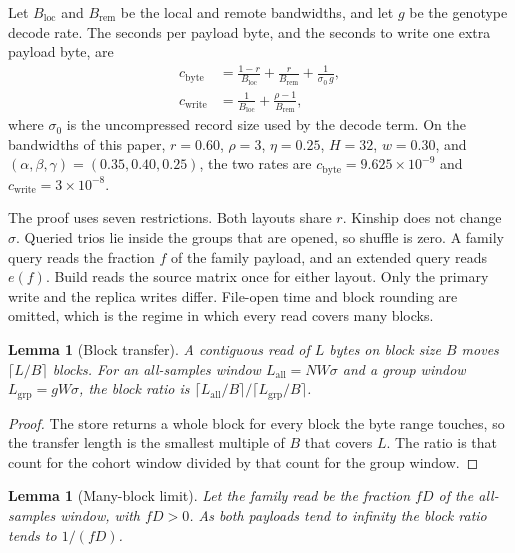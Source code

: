 \documentclass[11pt]{article}
\newtheorem{lemma}[theorem]{Lemma}
\begin{document}
Let \(B_{\mathrm{loc}}\) and \(B_{\mathrm{rem}}\) be the local and remote bandwidths, and let \(g\) be the genotype decode rate.
The seconds per payload byte, and the seconds to write one extra payload byte, are
\begin{align}
c_{\mathrm{byte}}
  &= \frac{1-r}{B_{\mathrm{loc}}} + \frac{r}{B_{\mathrm{rem}}} + \frac{1}{\sigma_0 \, g}, \\
c_{\mathrm{write}}
  &= \frac{1}{B_{\mathrm{loc}}} + \frac{\rho-1}{B_{\mathrm{rem}}},
\end{align}
where \(\sigma_0\) is the uncompressed record size used by the decode term.
On the bandwidths of this paper, \(r = 0.60\), \(\rho = 3\), \(\eta = 0.25\), \(H = 32\), \(w = 0.30\), and \((\alpha,\beta,\gamma) = (0.35, 0.40, 0.25)\),
the two rates are \(c_{\mathrm{byte}} = 9.625\times 10^{-9}\) and \(c_{\mathrm{write}} = 3\times 10^{-8}\).

The proof uses seven restrictions.
Both layouts share \(r\).
Kinship does not change \(\sigma\).
Queried trios lie inside the groups that are opened, so shuffle is zero.
A family query reads the fraction \(f\) of the family payload, and an extended query reads \(e(f)\).
Build reads the source matrix once for either layout.
Only the primary write and the replica writes differ.
File-open time and block rounding are omitted, which is the regime in which every read covers many blocks.

\begin{lemma}[Block transfer]
\label{lem:blocks}
A contiguous read of \(L\) bytes on block size \(B\) moves \(\lceil L/B \rceil\) blocks.
For an all-samples window \(L_{\mathrm{all}} = N W \sigma\) and a group window \(L_{\mathrm{grp}} = g W \sigma\), the block ratio is \(\lceil L_{\mathrm{all}}/B \rceil / \lceil L_{\mathrm{grp}}/B \rceil\).
\end{lemma}

\begin{proof}
The store returns a whole block for every block the byte range touches, so the transfer length is the smallest multiple of \(B\) that covers \(L\).
The ratio is that count for the cohort window divided by that count for the group window.
\end{proof}

\begin{lemma}[Many-block limit]
\label{lem:limit}
Let the family read be the fraction \(f D\) of the all-samples window, with \(f D > 0\).
As both payloads tend to infinity the block ratio tends to \(1/(f D)\).
\end{lemma}
\end{document}
